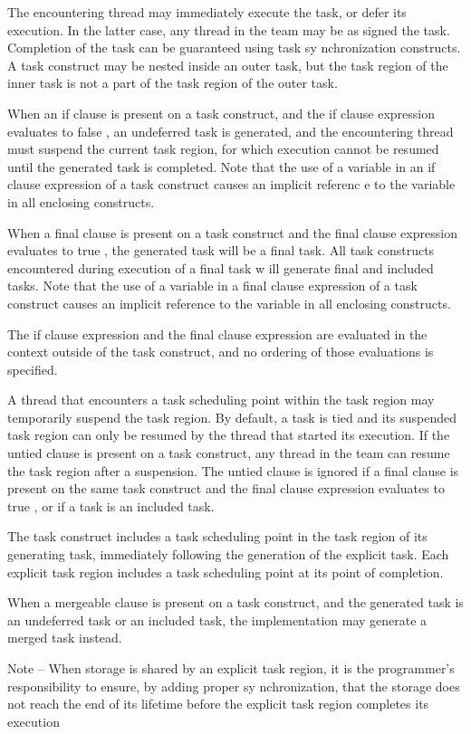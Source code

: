 The encountering thread may immediately execute the task, or defer its execution. In the latter case, any thread in the team may be as signed the task. Completion of the task can be guaranteed using task sy nchronization constructs. A task construct may be nested inside an outer task, but the task region of the inner task is not a part of the task region of the outer task.

When an if clause is present on a task construct, and the if clause expression evaluates to false , an undeferred task is generated, and the encountering thread must suspend the current task region, for which execution cannot be resumed until the generated task is completed. Note that the use of a variable in an if clause expression of a task construct causes an implicit referenc e to the variable in all enclosing constructs.

When a final clause is present on a task construct and the final clause expression evaluates to true , the generated task will be a final task. All task constructs encountered during execution of a final task w ill generate final and included tasks. Note that the use of a variable in a final clause expression of a task construct causes an implicit reference to the variable in all enclosing constructs.

The if clause expression and the final clause expression are evaluated in the context outside of the task construct, and no ordering of those evaluations is specified.

A thread that encounters a task scheduling point within the task region may temporarily suspend the task region. By default, a task is tied and its suspended task region can only be resumed by the thread that started its execution. If the untied clause is present on a task construct, any thread in the team can resume the task region after a suspension. The untied clause is ignored if a final clause is present on the same task construct and the final clause expression evaluates to true , or if a task is an included task.

The task construct includes a task scheduling point in the task region of its generating task, immediately following the generation of the explicit task. Each explicit task region includes a task scheduling point at its point of completion.

When a mergeable clause is present on a task construct, and the generated task is an undeferred task or an included task, the implementation may generate a merged task instead.

Note – When storage is shared by an explicit task region, it is the programmer's responsibility to ensure, by adding proper sy nchronization, that the storage does not reach the end of its lifetime before the explicit task region completes its execution 
